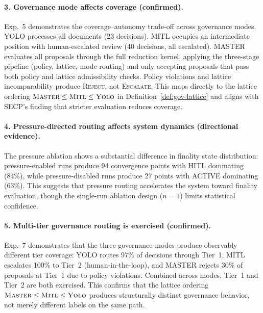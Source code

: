 \documentclass[11pt]{article}
\begin{document}
\paragraph{3. Governance mode affects coverage (confirmed).} Exp.~5 demonstrates the coverage--autonomy trade-off across governance modes. YOLO processes all documents (23 decisions). MITL occupies an intermediate position with human-escalated review (40 decisions, all escalated). MASTER evaluates all proposals through the full reduction kernel, applying the three-stage pipeline (policy, lattice, mode routing) and only accepting proposals that pass both policy and lattice admissibility checks. Policy violations and lattice incomparability produce \textsc{Reject}, not \textsc{Escalate}. This maps directly to the lattice ordering $\textsc{Master} \leq \textsc{Mitl} \leq \textsc{Yolo}$ in Definition~\ref{def:gov-lattice} and aligns with SECP's finding that stricter evaluation reduces coverage.

\paragraph{4. Pressure-directed routing affects system dynamics (directional evidence).} The pressure ablation shows a substantial difference in finality state distribution: pressure-enabled runs produce 94 convergence points with HITL dominating (84\%), while pressure-disabled runs produce 27 points with ACTIVE dominating (63\%). This suggests that pressure routing accelerates the system toward finality evaluation, though the single-run ablation design ($n = 1$) limits statistical confidence.

\paragraph{5. Multi-tier governance routing is exercised (confirmed).} Exp.~7 demonstrates that the three governance modes produce observably different tier coverage: YOLO routes 97\% of decisions through Tier~1, MITL escalates 100\% to Tier~2 (human-in-the-loop), and MASTER rejects 30\% of proposals at Tier~1 due to policy violations. Combined across modes, Tier~1 and Tier~2 are both exercised. This confirms that the lattice ordering $\textsc{Master} \leq \textsc{Mitl} \leq \textsc{Yolo}$ produces structurally distinct governance behavior, not merely different labels on the same path.
\end{document}
